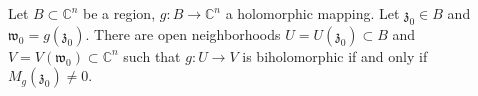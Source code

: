 Let $B \subset \mathbb{C}^n$ be a region, $g: B \rightarrow \mathbb{C}^n$ a holomorphic mapping. Let $\mathfrak{z}_0 \in B$ and $\mathfrak{w}_0 = g(\mathfrak{z}_0)$. There are open neighborhoods $U = U(\mathfrak{z}_0) \subset B$ and $V = V(\mathfrak{w}_0) \subset \mathbb{C}^n$ such that $g: U \rightarrow V$ is biholomorphic if and only if $M_g(\mathfrak{z}_0) \neq 0$.
